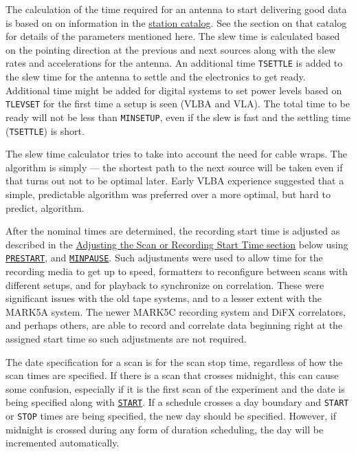 \documentclass{report}
\begin{document}
\begin{list}{}{\parsep 0em  \itemsep 0em }
\end{list}

The calculation of the time required for an antenna to start delivering
good data is based on on information in the
{\hyperref[SEC:STACAT]{station catalog}}.  See the section on that catalog
for details of the parameters mentioned here.  The slew time is calculated
based on the pointing direction at the previous and next sources along
with the slew rates and accelerations for the antenna.  An additional
time {\tt TSETTLE} is added to the slew time for
the antenna to settle and the electronics to get ready.  Additional
time might be added for digital systems to set power levels based
on {\tt TLEVSET} for the first time a setup is seen (VLBA and VLA).
The total time to be ready will not be less than {\tt MINSETUP}, even if
the slew is fast and the settling time ({\tt TSETTLE}) is short.  

The slew time calculator tries to take into account the need for cable
wraps.  The algorithm is simply --- the shortest path to the next
source will be taken even if that turns out not to be optimal later.
Early VLBA experience suggested that a simple, predictable algorithm
was preferred over a more optimal, but hard to predict, algorithm.

After the nominal times are determined, the recording start time is
adjusted as described in the 
{\hyperref[SSSEC:Starttime]{Adjusting the Scan or Recording Start Time section}}
below using 
{\hyperref[MP:PRESTART]{{\tt PRESTART}}}, and 
{\hyperref[MP:MINPAUSE]{{\tt MINPAUSE}}}.
Such adjustments were used to allow time for the recording media to
get up to speed, formatters to reconfigure between scans with different
setups, and for playback to synchronize on correlation.  These were
significant issues with the old tape systems, and to a lesser extent
with the MARK5A system.  The newer MARK5C recording system and DiFX
correlators, and perhaps others, are able to record and correlate data
beginning right at the assigned start time so such adjustments are
not required.

The date specification for a scan is for the scan stop time,
regardless of how the scan times are specified.  If there is a scan
that crosses midnight, this can cause some confusion, especially if it
is the first scan of the experiment and the date is being specified
along with 
{\hyperref[MP:START]{{\tt START}}}.  If a schedule crosses a
day boundary and {\tt START} or {\tt STOP} times are being specified,
the new day should be specified.  However, if midnight is crossed
during any form of duration scheduling, the day will be incremented
automatically.
\end{document}
